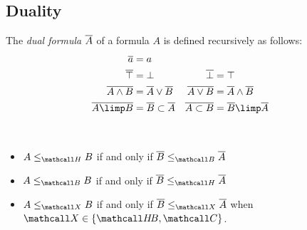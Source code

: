 \subsection{Duality}

\begin{definition}
  The \emph{dual formula} $\overline{A}$ of a formula $A$ is defined recursively
  as follows:
  \begin{align*}
    \soldual{a} &= a &\\
    \soldual{\top} &= \bot &
    \soldual{\bot} &= \top \\
    \soldual{A \land B} &= \soldual{A} \lor \soldual{B} &
    \soldual{A \lor B} &= \soldual{A} \land \soldual{B} \\
    \soldual{A \limp B} &= \soldual{B} \lsub \soldual{A} &
    \soldual{A \lsub B} &= \soldual{B} \limp \soldual{A}
  \end{align*}
\end{definition}

\begin{fact}[Duality]
  ~\\\vspace{-1em}
  \begin{itemize}
    \item $A \sementH B$ if and only if $\soldual{B} \sementB \soldual{A}$
    \item $A \sementB B$ if and only if $\soldual{B} \sementH \soldual{A}$
    \item $A \sementX B$ if and only if $\soldual{B} \sementX \soldual{A}$ when $\ACVar
    \in \{\HeytingBrouwer, \Boolean\}$.
  \end{itemize}
\end{fact}

